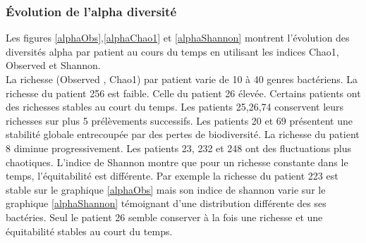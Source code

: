 \documentclass[12pt,a4paper]{article}
\begin{document}
\subsubsection{Évolution de l'alpha diversité}
Les figures \ref{alphaObs},\ref{alphaChao1} et \ref{alphaShannon} montrent l’évolution des diversités alpha par patient au cours du temps en utilisant les indices Chao1, Observed et Shannon. \\
La richesse (Observed , Chao1) par patient varie de 10 à 40 genres bactériens. La richesse du patient 256 est faible. Celle du patient 26 élevée.
Certains patients ont des richesses stables au court du temps. Les patients 25,26,74 conservent leurs richesses sur plus 5 prélèvements successifs. Les patients 20 et 69 présentent une stabilité globale entrecoupée par des pertes de biodiversité. La richesse du patient 8 diminue progressivement. Les patients 23, 232 et 248 ont des fluctuations plus chaotiques.
L'indice de Shannon montre que pour un richesse constante dans le temps, l'équitabilité est différente. Par exemple la richesse du patient 223 est stable sur le graphique \ref{alphaObs} mais son indice de shannon varie sur le graphique \ref{alphaShannon} témoignant d'une distribution différente des ses bactéries. Seul le patient 26 semble conserver à la fois une richesse et une équitabilité stables au court du temps.
\end{document}
